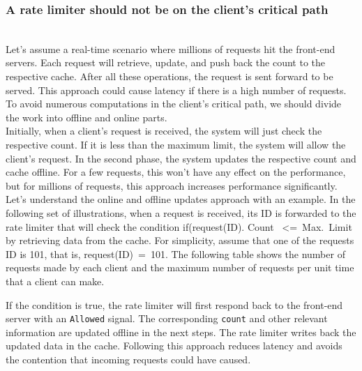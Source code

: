 \subsubsection{A rate limiter should not be on the client's critical path}\label{RoFeApY8UkdG-ip3TaCIH}
\\
Let's assume a real-time scenario where millions of requests hit the front-end servers. Each request will retrieve, update, and push back the count to the respective cache. After all these operations, the request is sent forward to be served. This approach could cause latency if there is a high number of requests. To avoid numerous computations in the client's critical path, we should divide the work into offline and online parts.
\\
Initially, when a client's request is received, the system will just check the respective count. If it is less than the maximum limit, the system will allow the client's request. In the second phase, the system updates the respective count and cache offline. For a few requests, this won't have any effect on the performance, but for millions of requests, this approach increases performance significantly.
\\
Let's understand the online and offline updates approach with an example. In the following set of illustrations, when a request is received, its ID is forwarded to the rate limiter that will check the condition if(request(ID). Count
\ \textless{=\ Max.\ Limit} by retrieving data from the cache. For simplicity, assume that one of the requests ID is 101, that is, request(ID)\ =\ 101. The following table shows the number of requests made by each client and the maximum number of requests per unit time that a client can make.

\begin{table}[htbp]
\centering
\small
{}
\end{table}

If the condition is true, the rate limiter will first respond back to the front-end server with an \texttt{Allowed} signal. The corresponding \texttt{count} and other relevant information are updated offline in the next steps. The rate limiter writes back the updated data in the cache. Following this approach reduces latency and avoids the contention that incoming requests could have caused.


